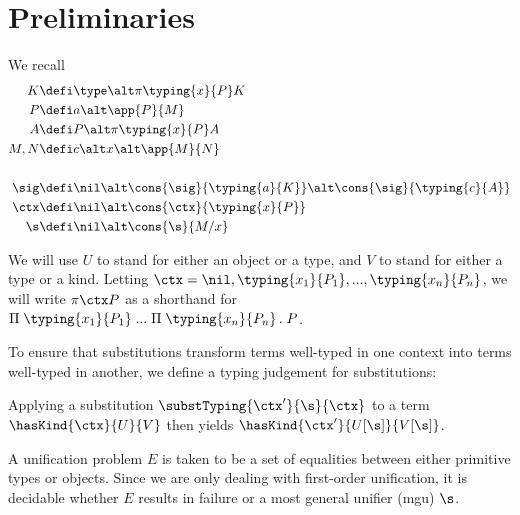 \documentclass[12pt]{article}
\begin{document}
\section*{Preliminaries}

We recall
\begin{align*}
  K &\defi \type \alt \pi{\typing{x}{P}}{K} \\
  P &\defi a \alt \app{P}{M} \\
  A &\defi P \alt \pi{\typing{x}{P}}{A} \\
  M, N &\defi c \alt x \alt \app{M}{N} \\
  \\
  \sig &\defi \nil \alt \cons{\sig}{\typing{a}{K}} \alt \cons{\sig}{\typing{c}{A}} \\
  \ctx &\defi \nil \alt \cons{\ctx}{\typing{x}{P}} \\
  \s &\defi \nil \alt \cons{\s}{M/x}
\end{align*}

We will use $U$ to stand for either an object or a type, and $V$ to stand for either a type or a kind.
Letting $\ctx = \nil, \typing{x_1}{P_1}, ..., \typing{x_n}{P_n}$, we will write $\pi{\ctx}{P}$ as a shorthand for $\Pi \; \typing{x_1}{P_1} \; ... \; \Pi \; \typing{x_n}{P_n} \, . \; P$. 

To ensure that substitutions transform terms well-typed in one context into terms well-typed in another, we define a typing judgement for substitutions:

{ %
\vspace{0.5cm}
\noindent {}

\begin{prooftree}
\end{prooftree}

\begin{prooftree}
\end{prooftree}

\vspace{0.5cm}
}

Applying a substitution $\substTyping{\ctx'}{\s}{\ctx}$ to a term $\hasKind{\ctx}{U}{V}$ then yields $\hasKind{\ctx'}{U[\s]}{V[\s]}$.

A unification problem $E$ is taken to be a set of equalities between either primitive types or objects.
Since we are only dealing with first-order unification, it is decidable whether $E$ results in failure or a most general unifier (mgu) $\s$.
\end{document}
